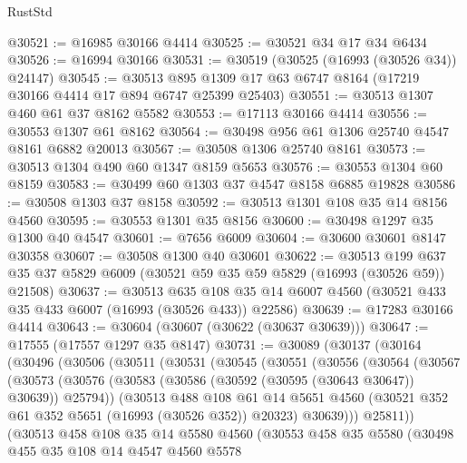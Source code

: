 \begin{lexlean}{RustStd}
\begin{coremodule}
@30521 := @16985 @30166 @4414
@30525 := @30521 @34 @17 @34 @6434
@30526 := @16994 @30166
@30531 := @30519 (@30525 (@16993 (@30526 @34)) @24147)
@30545 := @30513 @895 @1309 @17 @63 @6747 @8164 (@17219 @30166 @4414 @17 @894 @6747 @25399 @25403)
@30551 := @30513 @1307 @460 @61 @37 @8162 @5582
@30553 := @17113 @30166 @4414
@30556 := @30553 @1307 @61 @8162
@30564 := @30498 @956 @61 @1306 @25740 @4547 @8161 @6882 @20013
@30567 := @30508 @1306 @25740 @8161
@30573 := @30513 @1304 @490 @60 @1347 @8159 @5653
@30576 := @30553 @1304 @60 @8159
@30583 := @30499 @60 @1303 @37 @4547 @8158 @6885 @19828
@30586 := @30508 @1303 @37 @8158
@30592 := @30513 @1301 @108 @35 @14 @8156 @4560
@30595 := @30553 @1301 @35 @8156
@30600 := @30498 @1297 @35 @1300 @40 @4547
@30601 := @7656 @6009
@30604 := @30600 @30601 @8147 @30358
@30607 := @30508 @1300 @40 @30601
@30622 := @30513
    @199
    @637
    @35
    @37
    @5829
    @6009
    (@30521 @59 @35 @59 @5829 (@16993 (@30526 @59)) @21508)
@30637 := @30513
    @635
    @108
    @35
    @14
    @6007
    @4560
    (@30521 @433 @35 @433 @6007 (@16993 (@30526 @433)) @22586)
@30639 := @17283 @30166 @4414
@30643 := @30604 (@30607 (@30622 (@30637 @30639)))
@30647 := @17555 (@17557 @1297 @35 @8147)
@30731 := @30089
    (@30137
      (@30164
        (@30496
          (@30506
            (@30511
              (@30531
                (@30545
                  (@30551
                    (@30556
                      (@30564
                        (@30567
                          (@30573
                            (@30576
                              (@30583 (@30586 (@30592 (@30595 (@30643 @30647)) @30639)) @25794))
                            (@30513
                              @488
                              @108
                              @61
                              @14
                              @5651
                              @4560
                              (@30521 @352 @61 @352 @5651 (@16993 (@30526 @352)) @20323)
                              @30639)))
                        @25811))
                    (@30513
                      @458
                      @108
                      @35
                      @14
                      @5580
                      @4560
                      (@30553
                        @458
                        @35
                        @5580
                        (@30498
                          @455
                          @35
                          @108
                          @14
                          @4547
                          @4560
                          @5578

\end{coremodule}
\end{lexlean}
